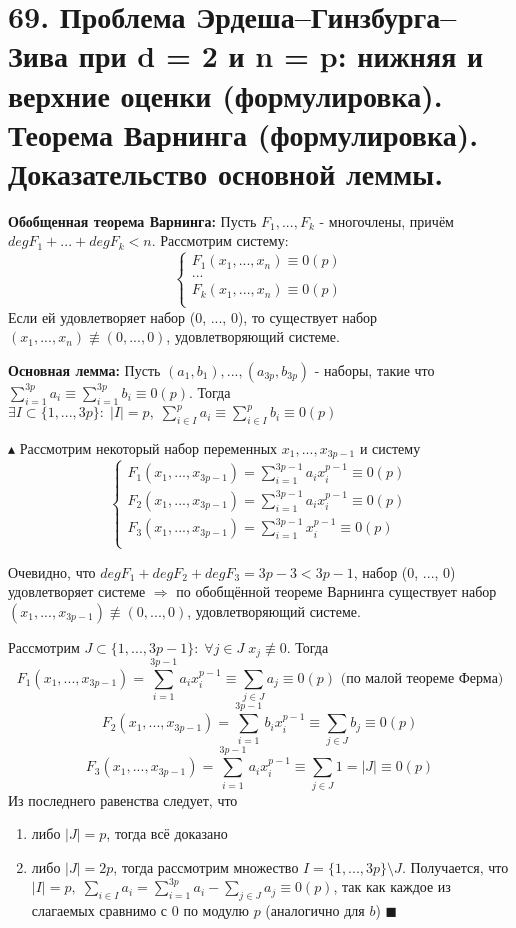 \section*{69. Проблема Эрдеша–Гинзбурга–Зива при d = 2 и n = p: нижняя и верхние оценки (формулировка). Теорема Варнинга (формулировка). Доказательство основной леммы.}
\par \textbf{Обобщенная теорема Варнинга: } Пусть $F_1, ..., F_k$ - многочлены, причём $deg F_1 +...+deg F_k < n$. Рассмотрим систему:
$$\left\{
\begin{array}{ccc}
F_1(x_1, ..., x_n) \equiv 0(p)\\
...\\
F_k(x_1, ..., x_n) \equiv 0(p)\\
\end{array}
\right. $$
Если ей удовлетворяет набор (0, ..., 0), то существует набор $(x_1, ..., x_n) \not\equiv (0, ..., 0)$, удовлетворяющий системе.
\par \textbf{Основная лемма: } Пусть $(a_1, b_1), ..., (a_{3p}, b_{3p})$ - наборы, такие что $\sum\limits_{i=1}^{3p}a_i \equiv \sum\limits_{i=1}^{3p}b_i \equiv 0(p)$. Тогда $\exists I \subset \{1, ..., 3p\}: \; |I|=p, \; \sum\limits_{i \in I}^{p}a_i \equiv \sum\limits_{i \in I}^{p}b_i \equiv 0 (p)$
\par $\blacktriangle$ Рассмотрим некоторый набор переменных $x_1, ..., x_{3p-1}$ и систему
$$\left\{
\begin{array}{ccc}
F_1(x_1, ..., x_{3p-1}) =\sum\limits_{i=1}^{3p-1}a_i x_i^{p-1} \equiv 0(p)\\
F_2(x_1, ..., x_{3p-1}) =\sum\limits_{i=1}^{3p-1}a_i x_i^{p-1} \equiv 0(p)\\
F_3(x_1, ..., x_{3p-1}) =\sum\limits_{i=1}^{3p-1}x_i^{p-1} \equiv 0(p)\\
\end{array}
\right. $$
\par Очевидно, что $deg F_1 + deg F_2 + deg F_3 = 3p - 3 < 3p-1$, набор (0, ..., 0) удовлетворяет системе $\Rightarrow$ по обобщённой теореме Варнинга существует набор $(x_1, ..., x_{3p-1}) \not\equiv (0, ..., 0)$, удовлетворяющий системе.
\par Рассмотрим $J \subset \{1, ..., 3p-1\}: \; \forall j \in J \; x_j \not\equiv 0$. Тогда
$$F_1(x_1, ..., x_{3p-1})=\sum_{i=1}^{3p-1}a_i x_i^{p-1} \equiv \sum_{j \in J}a_j \equiv 0(p) \mbox{ (по малой теореме Ферма)}$$
$$F_2(x_1, ..., x_{3p-1})=\sum_{i=1}^{3p-1}b_i x_i^{p-1} \equiv \sum_{j \in J}b_j \equiv 0(p)$$
$$F_3(x_1, ..., x_{3p-1})=\sum_{i=1}^{3p-1}a_i x_i^{p-1} \equiv \sum_{j \in J}1 = |J| \equiv 0(p)$$
Из последнего равенства следует, что 
\begin{enumerate}
    \item либо $|J|=p$, тогда всё доказано
    \item либо $|J|=2p$, тогда рассмотрим множество $I=\{1, ..., 3p\} \setminus J$. Получается, что $|I|=p, \; \sum\limits_{i \in I} a_i = \sum\limits_{i=1}^{3p}a_i-\sum\limits_{j \in J} a_j \equiv 0(p)$, так как каждое из слагаемых сравнимо с 0 по модулю $p$ (аналогично для $b$) $\blacksquare$
\end{enumerate}


